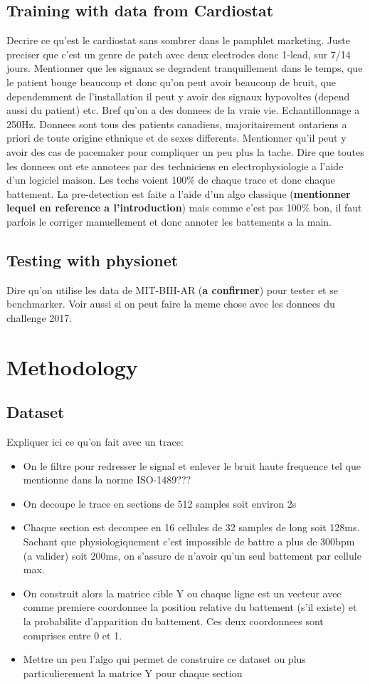 \documentclass{article}
\begin{document}
\subsection{Training with data from Cardiostat\texttrademark}
Decrire ce qu'est le cardiostat sans sombrer dans le pamphlet marketing. Juste preciser que c'est un genre de patch avec deux electrodes donc 1-lead, sur 7/14 jours. Mentionner que les signaux se degradent tranquillement dans le temps, que le patient bouge beaucoup et donc qu'on peut avoir beaucoup de bruit, que dependemment de l'installation il peut y avoir des signaux hypovoltes (depend aussi du patient) etc. Bref qu'on a des donnees de la vraie vie. Echantillonnage a 250Hz. Donnees sont tous des patients canadiens, majoritairement ontariens a priori de toute origine ethnique et de sexes differents. Mentionner qu'il peut y avoir des cas de pacemaker pour compliquer un peu plus la tache.
Dire que toutes les donnees ont ete annotees par des techniciens en electrophysiologie a l'aide d'un logiciel maison. Les techs voient 100\% de chaque trace et donc chaque battement. La pre-detection est faite a l'aide d'un algo classique (\textbf{mentionner lequel en reference a l'introduction}) mais comme c'est pas 100\% bon, il faut parfois le corriger manuellement et donc annoter les battements a la main.

\subsection{Testing with physionet}
Dire qu'on utilise les data de MIT-BIH-AR (\textbf{a confirmer}) pour tester et se benchmarker. Voir aussi si on peut faire la meme chose avec les donnees du challenge 2017.

\section{Methodology}
\subsection{Dataset}
Expliquer ici ce qu'on fait avec un trace: 
\begin{itemize}
\item On le filtre pour redresser le signal et enlever le bruit haute frequence tel que mentionne dans la norme ISO-1489???
\item On decoupe le trace en sections de 512 samples soit environ 2s
\item Chaque section est decoupee en 16 cellules de 32 samples de long soit 128ms. Sachant que physiologiquement c'est impossible de battre a plus de 300bpm (a valider) soit 200ms, on s'assure de n'avoir qu'un seul battement par cellule max.
\item On construit alors la matrice cible Y ou chaque ligne est un vecteur avec comme premiere coordonnee la position relative du battement (s'il existe) et la probabilite d'apparition du battement. Ces deux coordonnees sont comprises entre 0 et 1.
\item Mettre un peu l'algo qui permet de construire ce dataset ou plus particulierement la matrice Y pour chaque section
\end{itemize}
\end{document}

